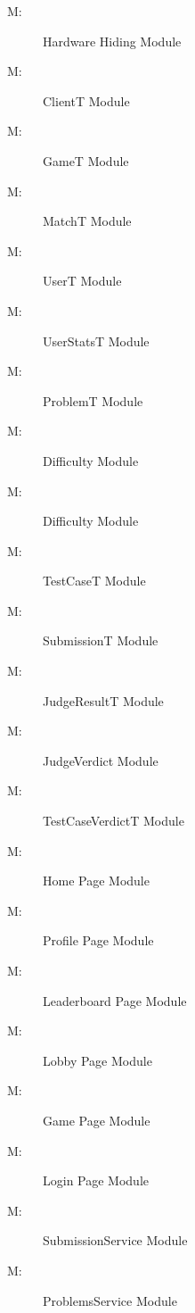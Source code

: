 \documentclass[12pt, titlepage]{article}
\newcounter{mnum}
\newcommand{\mthemnum}{M\themnum}
\begin{document}
\begin{description}
\item [ \mthemnum \label{mHH}:] Hardware Hiding Module
\item [ \mthemnum \label{mClientT}:] ClientT Module
\item [ \mthemnum \label{mGameT}:] GameT Module
\item [ \mthemnum \label{mMatchT}:] MatchT Module
\item [ \mthemnum \label{mUserT}:] UserT Module
\item [ \mthemnum \label{mUserStatsT}:] UserStatsT Module
\item [ \mthemnum \label{mProblemT}:] ProblemT Module
\item [ \mthemnum \label{mDifficulty}:] Difficulty Module
\item [ \mthemnum \label{mLanguage}:] Difficulty Module
\item [ \mthemnum \label{mTestCaseT}:] TestCaseT Module
\item [ \mthemnum \label{mSubmissionT}:] SubmissionT Module
\item [ \mthemnum \label{mJudgeResultT}:] JudgeResultT Module
\item [ \mthemnum \label{mJudgeVerdict}:] JudgeVerdict Module
\item [ \mthemnum \label{mTestCaseVerdictT}:] TestCaseVerdictT Module
\item [ \mthemnum \label{mHome}:] Home Page Module
\item [ \mthemnum \label{mProfile}:] Profile Page Module
\item [ \mthemnum \label{mLeaderboard}:] Leaderboard Page Module
\item [ \mthemnum \label{mLobby}:] Lobby Page Module
\item [ \mthemnum \label{mGame}:] Game Page Module
\item [ \mthemnum \label{mLogin}:] Login Page Module
\item [ \mthemnum \label{mSubmissionService}:] SubmissionService Module
\item [ \mthemnum \label{mProblemService}:] ProblemsService Module

\end{description}
\end{document}

